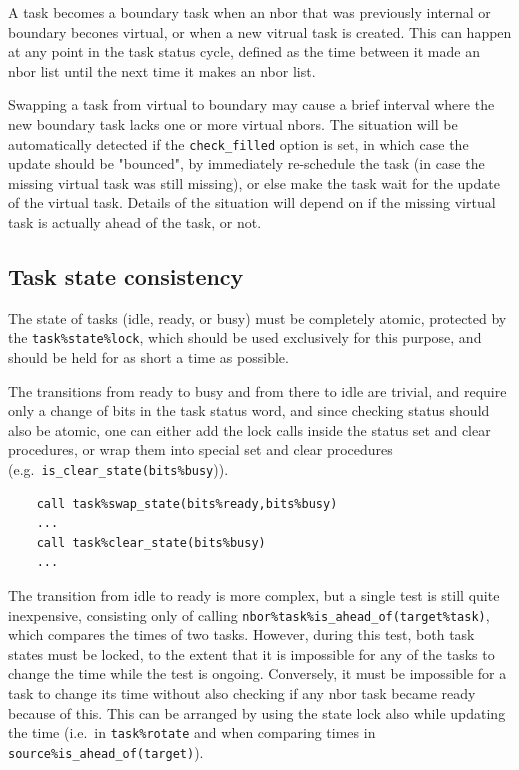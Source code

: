 \documentclass[paper=a4,fontsize=11pt]{scrartcl}
\numberwithin{equation}{section}		%
\numberwithin{figure}{section}			%
\numberwithin{table}{section}				%
\newcommand{\codecolor}{\color{Blue}}
\newcommand{\Code}[1]{{\codecolor\texttt{#1}}}
\def\eg{e.g.\ }
\def\ie{i.e.\ }
\begin{document}
A task becomes a boundary task when an nbor that was previously internal or boundary becones virtual, or when a new vitrual task is created.  This can happen at any point in the task status cycle, defined as the time between it made an nbor list until the next time it makes an nbor list.

Swapping a task from virtual to boundary may cause a brief interval where the new boundary task lacks one or more virtual nbors.  The situation will be automatically detected if the \Code{check\_filled} option is set, in which case the update should be "bounced", by immediately re-schedule the task (in case the missing virtual task was still missing), or else make the task wait for the update of the virtual task.  Details of the situation will depend on if the missing virtual task is actually ahead of the task, or not.

\subsection{Task state consistency}
The state of tasks (idle, ready, or busy) must be completely atomic, protected by the \verb|task%state%lock|, which should be used exclusively for this purpose, and should be held for as short a time as possible.

The transitions from ready to busy and from there to idle are trivial, and require only a change of bits in the task status word, and since checking status should also be atomic, one can either add the lock calls inside the status set and clear procedures, or wrap them into special set and clear procedures (\eg \verb|is_clear_state(bits%busy|)).
\begin{verbatim}
    call task%swap_state(bits%ready,bits%busy)
    ...
    call task%clear_state(bits%busy)
    ...
\end{verbatim}

The transition from idle to ready is more complex, but a single test is still quite inexpensive, consisting only of calling \verb|nbor%task%is_ahead_of(target%task)|, which compares the times of two tasks.  However, during this test, both task states must be locked, to the extent that it is impossible for any of the tasks to change the time while the test is ongoing.  Conversely, it must be impossible for a task to change its time without also checking if any nbor task became ready because of this.  This can be arranged by using the state lock also while updating the time (\ie in \verb|task%rotate| and when comparing times in \verb|source%is_ahead_of(target)|).
\end{document}
